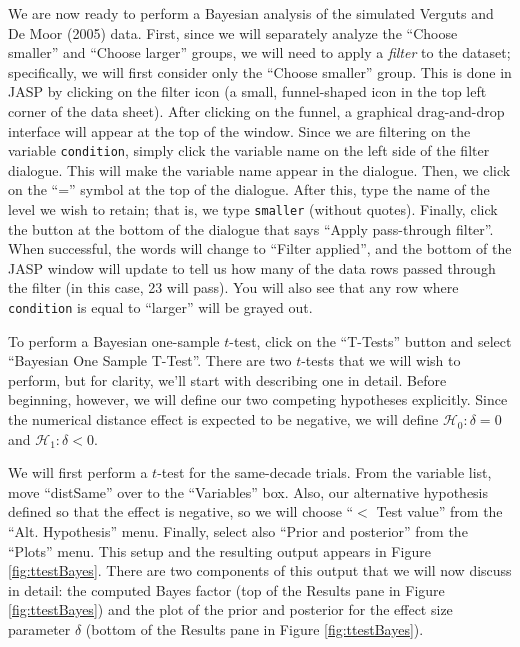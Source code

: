 \documentclass[english,,doc,floatsintext]{apa6}
\begin{document}
We are now ready to perform a Bayesian analysis of the simulated Verguts and De Moor (2005) data. First, since we will separately analyze the \enquote{Choose smaller} and \enquote{Choose larger} groups, we will need to apply a \emph{filter} to the dataset; specifically, we will first consider only the \enquote{Choose smaller} group. This is done in JASP by clicking on the filter icon (a small, funnel-shaped icon in the top left corner of the data sheet). After clicking on the funnel, a graphical drag-and-drop interface will appear at the top of the window. Since we are filtering on the variable \texttt{condition}, simply click the variable name on the left side of the filter dialogue. This will make the variable name appear in the dialogue. Then, we click on the \enquote{=} symbol at the top of the dialogue. After this, type the name of the level we wish to retain; that is, we type \texttt{smaller} (without quotes). Finally, click the button at the bottom of the dialogue that says \enquote{Apply pass-through filter}. When successful, the words will change to \enquote{Filter applied}, and the bottom of the JASP window will update to tell us how many of the data rows passed through the filter (in this case, 23 will pass). You will also see that any row where \texttt{condition} is equal to \enquote{larger} will be grayed out.

To perform a Bayesian one-sample \(t\)-test, click on the \enquote{T-Tests} button and select \enquote{Bayesian One Sample T-Test}. There are two \(t\)-tests that we will wish to perform, but for clarity, we'll start with describing one in detail. Before beginning, however, we will define our two competing hypotheses explicitly. Since the numerical distance effect is expected to be negative, we will define \(\mathcal{H}_0:\delta = 0\) and \(\mathcal{H}_1:\delta < 0\).

We will first perform a \(t\)-test for the same-decade trials. From the variable list, move \enquote{distSame} over to the \enquote{Variables} box. Also, our alternative hypothesis defined so that the effect is negative, so we will choose \enquote{\(<\) Test value} from the \enquote{Alt. Hypothesis} menu. Finally, select also \enquote{Prior and posterior} from the \enquote{Plots} menu. This setup and the resulting output appears in Figure \ref{fig:ttestBayes}. There are two components of this output that we will now discuss in detail: the computed Bayes factor (top of the Results pane in Figure \ref{fig:ttestBayes}) and the plot of the prior and posterior for the effect size parameter \(\delta\) (bottom of the Results pane in Figure \ref{fig:ttestBayes}).
\end{document}
